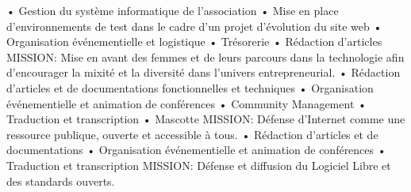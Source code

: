 \documentclass[
	a4paper,
]{fortysecondscv}
\begin{document}
\newpage
\makebacksidebar
\begin{cvtable}[3]
    {
        • Gestion du système informatique de l’association\newline
        • Mise en place d’environnements de test dans le cadre d’un projet 
        d’évolution du site web\newline
        • Organisation événementielle et logistique\newline
        • Trésorerie\newline
        • Rédaction d’articles\newline
        MISSION: Mise en avant des femmes et de leurs parcours dans la 
        technologie afin d'encourager la mixité et la diversité dans l’univers 
        entrepreneurial.\newline
    }
    {    
        • Rédaction d’articles et de documentations fonctionnelles et \newline
        techniques\newline
        • Organisation événementielle et animation de conférences\newline
        • Community Management\newline
        • Traduction et transcription\newline
        • Mascotte\newline
        MISSION: Défense d’Internet comme une ressource publique, ouverte et 
        accessible à tous.\newline
	}
    {
        • Rédaction d’articles et de documentations\newline
        • Organisation événementielle et animation de conférences\newline
        • Traduction et transcription\newline
        MISSION: Défense et diffusion du Logiciel Libre et des standards 
        ouverts.\newline
    }
\end{cvtable}
\end{document}
